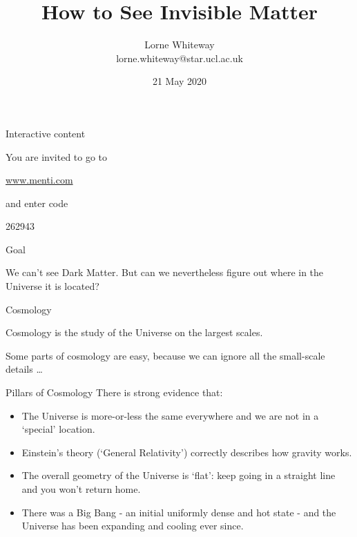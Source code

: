\documentclass[usenames,dvipsnames]{beamer}
\title{How to See Invisible Matter}
\author{Lorne Whiteway \\ lorne.whiteway@star.ucl.ac.uk}
\institute{Astrophysics Group \\ Department of Physics and Astronomy \\ University College London}
\date{21 May 2020}
\newcommand{\mentiurl}[0]{{\url{www.menti.com}}}
\newcommand{\menticode}[0]{{262943}}
\begin{document}
\frame{\titlepage}


\begin{frame}{Interactive content}
  \begin{block}{}
    You are invited to go to\\
    \begin{center}
    \huge \alert{\mentiurl{}}\\
    \end{center}
    and enter code\\
    \begin{center}
    \huge \menticode{}
    \end{center}
  \end{block}
\end{frame}

\begin{frame}{Goal}
  \begin{block}{}
    We can't see Dark Matter. But can we nevertheless figure out where in the Universe it is located?
  \end{block}
\end{frame}

\begin{frame}{Cosmology}
  \begin{block}{}
    Cosmology is the study of the Universe on the largest scales.
  \end{block}
  \begin{block}{}
    Some parts of cosmology are easy, because we can ignore all the small-scale details \ldots
  \end{block}
\end{frame}

\begin{frame}{Pillars of Cosmology}
  There is strong evidence that:
  \begin{block}{}
    \begin{itemize}
      \item{The Universe is more-or-less the same everywhere and we are not in a `special' location.}
      \item{Einstein's theory (`General Relativity') correctly describes how gravity works.}
      \item{The overall geometry of the Universe is `flat': keep going in a straight line and you won't return home.}
      \item{There was a Big Bang - an initial uniformly dense and hot state - and the Universe has been expanding and cooling ever since.}
    \end{itemize}
  \end{block}
\end{frame}
\end{document}
